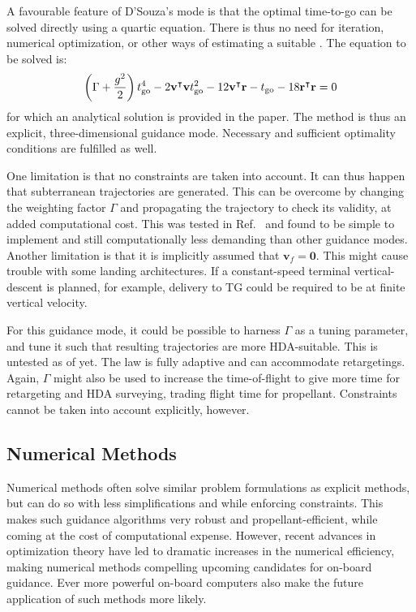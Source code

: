 \documentclass[%
]{aiaa-tc}
\begin{document}
A favourable feature of D'Souza's mode is that the optimal time-to-go can be
solved directly using a quartic equation. There is thus no need for iteration,
numerical optimization, or other ways of estimating a suitable \tgo.
The equation to be solved is:
\begin{align}
    \left(\Gamma + \frac{g^2}{2}\right) t_{\text{go}}^4 - 2{\mathbf{v}}^{\intercal}\mathbf{v}
    t_{\text{go}}^2 - 12 {\mathbf{v}}^{\intercal}\mathbf{r} - t_{\text{go}} - 18 {\mathbf{r}}^{\intercal}
	\mathbf{r} = 0
\end{align}
for which an analytical solution is provided in the paper.
The method is thus an explicit, three-dimensional guidance mode. Necessary
and sufficient optimality conditions are fulfilled as well. 

One limitation is that no constraints are taken into account. It can thus happen
that subterranean trajectories are generated. This can be overcome by changing
the weighting factor $\Gamma$ and propagating the trajectory to check its
validity, at added computational cost. This was tested in
Ref.~ and found to be simple to implement and still
computationally less demanding than other guidance modes. Another limitation is
that it is implicitly assumed that $\mathbf{v}_f = \mathbf{0}$. This might cause
trouble with some landing architectures. If a constant-speed terminal
vertical-descent is planned, for example, delivery to TG could be
required to be at finite vertical velocity.

For this guidance mode, it could be possible to harness $\Gamma$ as a tuning
parameter, and tune it such that resulting trajectories are more HDA-suitable.
This is untested as of yet. The law is fully adaptive and can accommodate
retargetings. Again, $\Gamma$ might also be used to increase the time-of-flight
to give more time for retargeting and HDA surveying, trading flight time for
propellant. Constraints cannot be taken into account explicitly, however.

\subsection{Numerical Methods}
\label{sec:numerical}

Numerical methods often solve similar problem formulations as explicit methods,
but can do so with less simplifications and while enforcing constraints. This
makes such guidance algorithms very robust and propellant-efficient, while
coming at the cost of computational expense. However, recent advances in
optimization theory have led to dramatic increases in the numerical efficiency,
making numerical methods compelling upcoming candidates for on-board guidance.
Ever more powerful on-board computers also make the future application of such
methods more likely.
\end{document}
